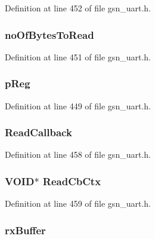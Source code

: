 Definition at line 452 of file gsn\_\-uart.h.

\hypertarget{a00263_a96ecaff82c1cc0fe60c48e5eb2b2e471}{
\subsubsection[{noOfBytesToRead}]{ {\bf noOfBytesToRead}}}
\label{a00263_a96ecaff82c1cc0fe60c48e5eb2b2e471}


Definition at line 451 of file gsn\_\-uart.h.

\hypertarget{a00263_a733fb7afbc3bd37a546de0e37c12f150}{
\subsubsection[{pReg}]{ {\bf pReg}}}
\label{a00263_a733fb7afbc3bd37a546de0e37c12f150}


Definition at line 449 of file gsn\_\-uart.h.

\hypertarget{a00263_a73e06b436ebc4ceeb7b949d3487b76ba}{
\subsubsection[{ReadCallback}]{ {\bf ReadCallback}}}
\label{a00263_a73e06b436ebc4ceeb7b949d3487b76ba}


Definition at line 458 of file gsn\_\-uart.h.

\hypertarget{a00263_ab670c794162551aa7f8c6a4103007e7b}{
\subsubsection[{ReadCbCtx}]{\setlength{\rightskip}{0pt plus 5cm}VOID$\ast$ {\bf ReadCbCtx}}}
\label{a00263_ab670c794162551aa7f8c6a4103007e7b}


Definition at line 459 of file gsn\_\-uart.h.

\hypertarget{a00263_aceef132d7c6846efeb1a96c1aaa7cd5b}{
\subsubsection[{rxBuffer}]{ {\bf rxBuffer}}}
\label{a00263_aceef132d7c6846efeb1a96c1aaa7cd5b}


